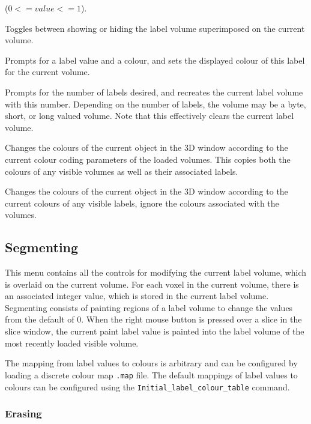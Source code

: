\documentclass[11pt,letterpaper]{article}
\newcommand{\ident}[1]{{\tt #1}}
\newcommand{\menutwo}[2]{{\scriptsize \fbox{\bf #1}/\fbox{\bf #2}}}
\begin{document}
\begin{description}
  ($0 <= value <= 1$).
\item[\menutwo{Colour Coding}{Show Labels}]  Toggles between showing
  or hiding the label volume superimposed on the current
  volume.
\item[\menutwo{Colour Coding}{Set Paint Lbl Colour}]  Prompts for a
  label value and a colour, and sets the displayed
  colour of this label for the current volume.
\item[\menutwo{Colour Coding}{Num Labels}] Prompts for the number of
  labels desired, and recreates the current label volume with this
  number.  Depending on the number of labels, the volume may be a
  byte, short, or long valued volume.  Note that this effectively
  clears the current label volume.
\item[\menutwo{Colour Coding}{Colour Code Objects}]  Changes the
  colours of the current object in the 3D window according to the current
  colour coding parameters of the loaded volumes. This copies both the
  colours of any visible volumes as well as their associated labels.
\item[\menutwo{Colour Coding}{Label Objects}]  Changes the
  colours of the current object in the 3D window according to the current
  colours of any visible labels, ignore the colours associated with the 
  volumes.
\end{description}

\subsection{Segmenting}

This menu contains all the controls for modifying the current label
volume, which is overlaid on the current volume. For each voxel in the
current volume, there is an associated integer value, which is stored in
the current label volume. Segmenting consists of painting regions of a
label volume to change the values from the default of 0.  When the right
mouse button is pressed over a slice in the slice window, the current
paint label value is painted into the label volume of the most recently
loaded visible volume.  

The mapping from label values to colours is arbitrary and can
be configured by loading a discrete colour map \ident{.map} file. The
default mappings of label values to colours can be configured using the
{\tt Initial\_label\_colour\_table} command.

\subsubsection{Erasing}
\end{document}
